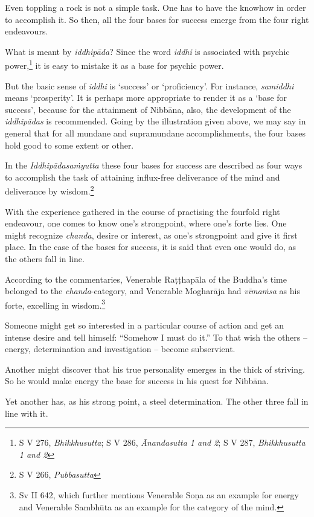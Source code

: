 Even toppling a rock is not a simple task. One has to have the knowhow in order to accomplish it. So then, all the four bases for success emerge from the four right endeavours.

What is meant by \emph{iddhipāda}? Since the word \emph{iddhi} is associated with psychic power,\footnote{S V 276, \emph{Bhikkhusutta}; S V 286, \emph{Ānandasutta 1 and 2}; S V 287, \emph{Bhikkhusutta 1 and 2}} it is easy to mistake it as a base for psychic power.

But the basic sense of \emph{iddhi} is `success' or `proficiency'. For instance, \emph{samiddhi} means `prosperity'. It is perhaps more appropriate to render it as a `base for success', because for the attainment of Nibbāna, also, the development of the \emph{iddhipādas} is recommended. Going by the illustration given above, we may say in general that for all mundane and supramundane accomplishments, the four bases hold good to some extent or other.

In the \emph{Iddhipādasaṁyutta} these four bases for success are described as four ways to accomplish the task of attaining influx-free deliverance of the mind and deliverance by wisdom.\footnote{S V 266, \emph{Pubbasutta}}

With the experience gathered in the course of practising the fourfold right endeavour, one comes to know one's strongpoint, where one's forte lies. One might recognize \emph{chanda}, desire or interest, as one's strongpoint and give it first place. In the case of the bases for success, it is said that even one would do, as the others fall in line.

According to the commentaries, Venerable Raṭṭhapāla of the Buddha's time belonged to the \emph{chanda}-category, and Venerable Mogharāja had \emph{vīmaṁsa} as his forte, excelling in wisdom.\footnote{Sv II 642, which further mentions Venerable Soṇa as an example for energy and Venerable Sambhūta as an example for the category of the mind.}

Someone might get so interested in a particular course of action and get an intense desire and tell himself: ``Somehow I must do it.'' To that wish the others -- energy, determination and investigation -- become subservient.

Another might discover that his true personality emerges in the thick of striving. So he would make energy the base for success in his quest for Nibbāna.

Yet another has, as his strong point, a steel determination. The other three fall in line with it.

